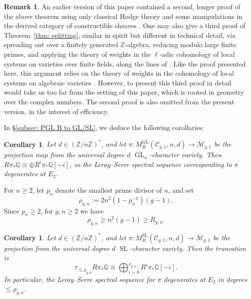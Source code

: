 \documentclass[11pt,reqno]{amsart}
\theoremstyle{plain} %
\newtheorem{corollary}[theorem]{Corollary}
\theoremstyle{definition}
\newtheorem{remark}[theorem]{Remark}
\newcommand{\QQ}{\mathbb{Q}}
\newcommand{\M}{\mathcal{M}}
\newcommand{\C}{\mathcal{C}}
\newcommand{\ZZ}{\mathbb{Z}}
\DeclareMathOperator{\GL}{GL}
\DeclareMathOperator{\SL}{SL}
\begin{document}
\begin{remark}
An earlier version of this paper contained a second, longer proof of the above theorem using only classical Hodge theory and some manipulations in the derived category of constructible sheaves \cite[Section~3.5]{BJLPZv2}. One may also give a third proof of Theorem~\ref{thm: splitting}, similar in spirit but different in technical detail, via spreading out over a finitely generated $\ZZ$-algebra, reducing modulo large finite primes, and applying the theory of weights in the $\ell$-adic cohomology of local systems on varieties over finite fields, along the lines of \cite[Theorem~5.4.5]{BBD}. Like the proof presented here, this argument relies on the theory of weights in the cohomology of local systems on algebraic varieties \cite{DelignePoids}. However, to present this third proof in detail would take us too far from the setting of this paper, which is rooted in geometry over the complex numbers. The second proof is also omitted from the present version, in the interest of efficiency.
\end{remark}

In \S \ref{subsec: PGL B to GL/SL}, we deduce the following corollaries:

\begin{corollary} \label{cor: splitting, GL}
    Let $d \in (\ZZ/n\ZZ)^*$, and let  $\pi\colon M_B^{\GL}(\C_{g,1},n,d) \to \M_{g,1}$ be the projection map from the universal degree $d$ $\GL_n$-character variety.  %
    Then $R\pi_* {\QQ} \cong \oplus R^i \pi_* {\QQ}[-i]$, so the Leray--Serre spectral sequence corresponding to $\pi$ degenerates at $E_2$.
\end{corollary}

For $n\geq 2$, let $p_n$ denote the smallest prime divisor of $n$, and set
\begin{equation}\label{eq:rho-range}
\rho_{g,n}:=2n^2(1-p_n^{-1})(g-1).
\end{equation}
Since $p_n\geq 2$, for $g,n\geq 2$ we have
\begin{equation}\label{eq:rho-bound}
\rho_{g,n}\geq n^2(g-1)\geq R_{g,n}.
\end{equation}

\begin{corollary} \label{cor: splitting, SL}
    Let $d \in (\ZZ/n\ZZ)^*$, and let $\pi\colon M_B^{\SL}(\C_{g,1},n,d) \to \M_{g,1}$ be the projection from the universal degree $d$ $\SL$-character variety. Then the truncation is $$\tau_{\le \rho_{g,n}} R\pi_* {\QQ} \cong \bigoplus_{i=0}^{\rho_{g,n}} R^i\pi_* {\QQ}[-i].$$
    In particular, the Leray--Serre spectral sequence for $\pi$ degenerates at $E_2$ in degrees $\le \rho_{g,n}$.
\end{corollary}
\end{document}
